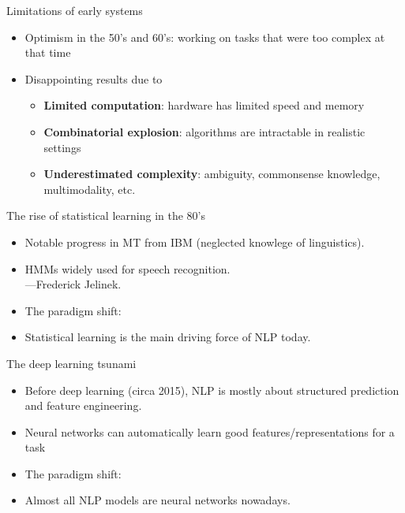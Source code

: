 \documentclass[usenames,dvipsnames,notes,11pt,aspectratio=169]{beamer}
\begin{document}
\begin{frame}
    {Limitations of early systems}
    \begin{itemize}
        \itemsep1em
        \item Optimism in the 50's and 60's: working on tasks that were too complex at that time\\[1ex]
        \item Disappointing results due to
            \begin{itemize}
                \item \textbf{Limited computation}: hardware has limited speed and memory 
                \item \textbf{Combinatorial explosion}: algorithms are intractable in realistic settings
                \item \textbf{Underestimated complexity}: ambiguity, commonsense knowledge, multimodality, etc.
            \end{itemize}
    \end{itemize}
\end{frame}

\begin{frame}
    {The rise of statistical learning in the 80's}
    \begin{itemize}
        \itemsep1em
        \item Notable progress in MT from IBM (neglected knowlege of linguistics).
        \item HMMs widely used for speech recognition.\\[1ex]
            ---Frederick Jelinek.
        \item The paradigm shift: 
        \item Statistical learning is the main driving force of NLP today.
    \end{itemize}
\end{frame}

\begin{frame}
    {The deep learning tsunami}
    \begin{itemize}
        \itemsep1em
        \item Before deep learning (circa 2015), NLP is mostly about structured prediction and feature engineering.
        \item Neural networks can automatically learn good features/representations for a task 
        \item The paradigm shift: 
        \item Almost all NLP models are neural networks nowadays.
    \end{itemize}
\end{frame}
\end{document}
